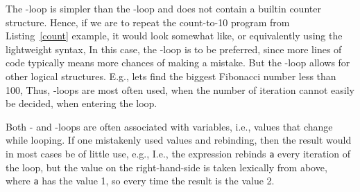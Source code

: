 \begin{comment}
  For the alternative \keyword{for}-loop, consider the problem,
  \begin{problem}
    Write a program that identifies prime factors of a given integer $n$.
  \end{problem}
  Prime numbers are integers divisible only be 1 and themselves with zero remainder. Let's assume that we already have identified a list of primes from 2 to $n$, then we could write a program that checks the remainder as follows,
  \fs{primeCheck}{Checking whether a given number has remainder zero after division by some low prime numbers.}
  In this example, the variable \lstinline!i! runs through the elements of a list, which will be discussed in further detail in  Chapter~\ref{chap:lists}.
\end{comment}

The -loop is simpler than the -loop and does not contain a builtin counter structure. Hence, if we are to repeat the count-to-10 program from Listing~\ref{count} example, it would look somewhat like,
%
%
or equivalently using the lightweight syntax,
%
%
In this case, the -loop is to be preferred, since more lines of code typically means more chances of making a mistake. But the -loop allows for other logical structures. E.g., lets find the biggest Fibonacci number less than 100,
%
%
Thus, -loops are most often used, when the number of iteration cannot easily be decided, when entering the loop.

Both - and -loops are often associated with variables, i.e., values that change while looping. If one mistakenly used values and rebinding, then the result would in most cases be of little use, e.g.,
%
%
I.e., the  expression rebinds \lstinline!a! every iteration of the loop, but the value on the right-hand-side is taken lexically from above, where \lstinline!a! has the value 1, so every time the result is the value 2.

